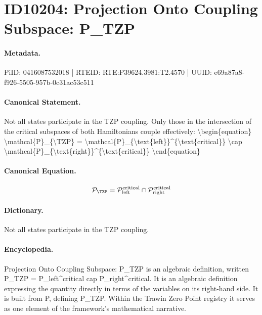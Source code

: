 \section*{ID10204: Projection Onto Coupling Subspace: P\_TZP}
\paragraph{Metadata.}
PiID: 0416087532018 | RTEID: RTE:P39624.3981:T2.4570 | UUID: e69a87a8-f926-5505-957b-0c31ac53c511

\paragraph{Canonical Statement.}
Not all states participate in the TZP coupling. Only those in the intersection of the critical subspaces of both Hamiltonians couple effectively: \textbackslash{}begin\{equation\} \textbackslash{}mathcal\{P\}\_\{\textbackslash{}TZP\} = \textbackslash{}mathcal\{P\}\_\{\textbackslash{}text\{left\}\}\textasciicircum{}\{\textbackslash{}text\{critical\}\} \textbackslash{}cap \textbackslash{}mathcal\{P\}\_\{\textbackslash{}text\{right\}\}\textasciicircum{}\{\textbackslash{}text\{critical\}\} \textbackslash{}end\{equation\}

\paragraph{Canonical Equation.}
\[
\mathcal{P}_{\TZP} = \mathcal{P}_{\text{left}}^{\text{critical}} \cap \mathcal{P}_{\text{right}}^{\text{critical}}
\]

\paragraph{Dictionary.}
Not all states participate in the TZP coupling.

\paragraph{Encyclopedia.}
Projection Onto Coupling Subspace: P\_TZP is an algebraic definition, written P\_TZP = P\_left\textasciicircum{}critical cap P\_right\textasciicircum{}critical. It is an algebraic definition expressing the quantity directly in terms of the variables on its right-hand side. It is built from P, defining P\_TZP. Within the Trawin Zero Point registry it serves as one element of the framework's mathematical narrative.
